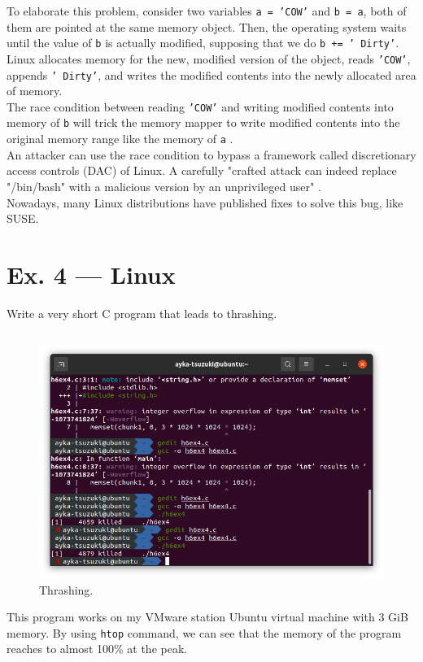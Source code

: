 \documentclass[a4paper]{article}
\begin{document}
\begin{enumerate}
    To elaborate this problem, consider two variables \texttt{a = 'COW'} and \texttt{b = a}, both of them are pointed at the same memory object. Then, the operating system waits until the value of \texttt{b} is actually modified, supposing that we do \texttt{b += ' Dirty'}. Linux allocates memory for the new, modified version of the object, reads \texttt{'COW'}, appends \texttt{' Dirty'}, and writes the modified contents into the newly allocated area of memory.\\
    The race condition between reading \texttt{'COW'} and writing modified contents into memory of \texttt{b} will trick the memory mapper to write modified contents into the original memory range like the memory of \texttt{a} \cite{dirtycow}.\\
    An attacker can use the race condition to bypass a framework called discretionary access controls (DAC) of Linux. A carefully "crafted attack can indeed replace "/bin/bash" with a malicious version by an unprivileged user" \cite{dirtycow}.\\
    Nowadays, many Linux distributions have published fixes to solve this bug, like SUSE.
\end{enumerate}
\section*{Ex. 4 — Linux}
Write a very short C program that leads to thrashing.
\inputminted[frame=single,bgcolor=bg,breaklines,linenos]{c}{h6ex4.c}
\begin{figure}[H]
    \centering
    \includegraphics[width=1\textwidth]{1.png}
    \caption{Thrashing.}
\end{figure}
This program works on my VMware station Ubuntu virtual machine with 3 GiB memory. By using \texttt{htop} command, we can see that the memory of the program reaches to almost 100\% at the peak.
\printbibliography
\end{document}

